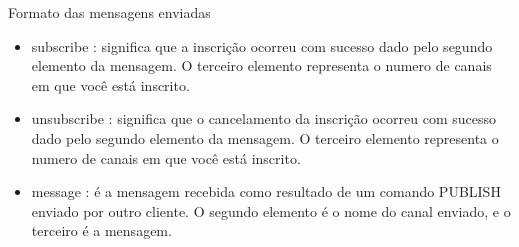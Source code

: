 \documentclass[12pt,a4paper]{article}
\begin{document}
Formato das mensagens enviadas

\begin{itemize}
\item subscribe : significa que a inscrição ocorreu com sucesso dado pelo segundo elemento da mensagem. O terceiro elemento representa o numero de canais em que você está inscrito.
\item unsubscribe : significa que o cancelamento da inscrição ocorreu com sucesso dado pelo segundo elemento da mensagem. O terceiro elemento representa o numero de canais em que você está inscrito.
\item message : é a mensagem recebida como resultado de um comando PUBLISH enviado por outro cliente. O segundo elemento é o nome do canal enviado, e o terceiro é a mensagem.  
\end{itemize}
\end{document}
